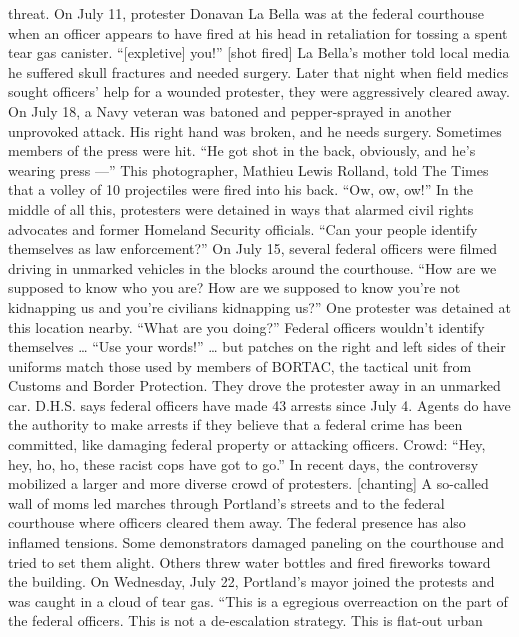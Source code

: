 \begin{itemize}
  threat. On July 11, protester Donavan La Bella was at the federal
  courthouse when an officer appears to have fired at his head in
  retaliation for tossing a spent tear gas canister. ``{[}expletive{]}
  you!'' {[}shot fired{]} La Bella's mother told local media he suffered
  skull fractures and needed surgery. Later that night when field medics
  sought officers' help for a wounded protester, they were aggressively
  cleared away. On July 18, a Navy veteran was batoned and
  pepper-sprayed in another unprovoked attack. His right hand was
  broken, and he needs surgery. Sometimes members of the press were hit.
  ``He got shot in the back, obviously, and he's wearing press ---''
  This photographer, Mathieu Lewis Rolland, told The Times that a volley
  of 10 projectiles were fired into his back. ``Ow, ow, ow!'' In the
  middle of all this, protesters were detained in ways that alarmed
  civil rights advocates and former Homeland Security officials. ``Can
  your people identify themselves as law enforcement?'' On July 15,
  several federal officers were filmed driving in unmarked vehicles in
  the blocks around the courthouse. ``How are we supposed to know who
  you are? How are we supposed to know you're not kidnapping us and
  you're civilians kidnapping us?'' One protester was detained at this
  location nearby. ``What are you doing?'' Federal officers wouldn't
  identify themselves \ldots{} ``Use your words!'' \ldots{} but patches
  on the right and left sides of their uniforms match those used by
  members of BORTAC, the tactical unit from Customs and Border
  Protection. They drove the protester away in an unmarked car. D.H.S.
  says federal officers have made 43 arrests since July 4. Agents do
  have the authority to make arrests if they believe that a federal
  crime has been committed, like damaging federal property or attacking
  officers. Crowd: ``Hey, hey, ho, ho, these racist cops have got to
  go.'' In recent days, the controversy mobilized a larger and more
  diverse crowd of protesters. {[}chanting{]} A so-called wall of moms
  led marches through Portland's streets and to the federal courthouse
  where officers cleared them away. The federal presence has also
  inflamed tensions. Some demonstrators damaged paneling on the
  courthouse and tried to set them alight. Others threw water bottles
  and fired fireworks toward the building. On Wednesday, July 22,
  Portland's mayor joined the protests and was caught in a cloud of tear
  gas. ``This is a egregious overreaction on the part of the federal
  officers. This is not a de-escalation strategy. This is flat-out urban

\end{itemize}
